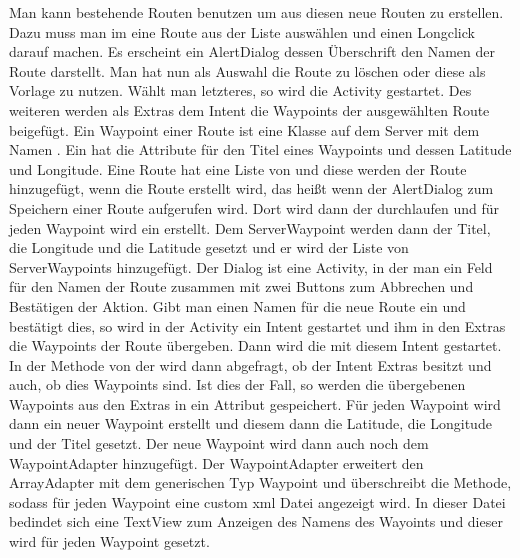 Man kann bestehende Routen benutzen um aus diesen neue Routen zu erstellen. Dazu muss man im  eine  Route aus der Liste auswählen und einen Longclick darauf machen. Es erscheint ein AlertDialog dessen Überschrift den Namen der Route darstellt. Man hat nun als Auswahl die Route zu löschen oder diese als Vorlage zu nutzen. Wählt man letzteres, so wird die Activity  gestartet. Des weiteren werden als Extras dem Intent die Waypoints der ausgewählten Route beigefügt. Ein Waypoint einer Route ist eine Klasse auf dem Server mit dem Namen . Ein  hat die Attribute für den Titel eines Waypoints und dessen Latitude und Longitude. Eine Route hat eine Liste von  und diese werden der Route hinzugefügt, wenn die Route erstellt wird, das heißt wenn der AlertDialog zum Speichern einer Route aufgerufen wird. Dort wird dann der  durchlaufen und für jeden Waypoint wird ein  erstellt. Dem ServerWaypoint werden dann der Titel, die Longitude und die Latitude gesetzt und er wird der Liste von ServerWaypoints hinzugefügt. Der Dialog ist eine Activity, in der man ein Feld für den Namen der Route zusammen mit zwei Buttons zum Abbrechen und Bestätigen der Aktion. Gibt man einen Namen für die neue Route ein und bestätigt dies, so wird in der Activity ein Intent gestartet und ihm in den Extras die Waypoints der Route übergeben. Dann wird die  mit diesem Intent gestartet. In der  Methode von der  wird dann abgefragt, ob der Intent Extras besitzt und auch, ob dies Waypoints sind. Ist dies der Fall, so  werden die übergebenen Waypoints aus den Extras in ein Attribut gespeichert. Für jeden Waypoint wird dann ein neuer Waypoint erstellt und diesem dann die Latitude,  die Longitude und der Titel gesetzt. Der neue Waypoint wird dann auch noch dem WaypointAdapter hinzugefügt. Der WaypointAdapter erweitert den ArrayAdapter mit dem generischen Typ Waypoint und überschreibt die  Methode, sodass für jeden Waypoint eine custom xml Datei angezeigt wird. In dieser Datei bedindet sich eine TextView zum Anzeigen des Namens des Wayoints und dieser wird für jeden Waypoint gesetzt.
\FloatBarrier

